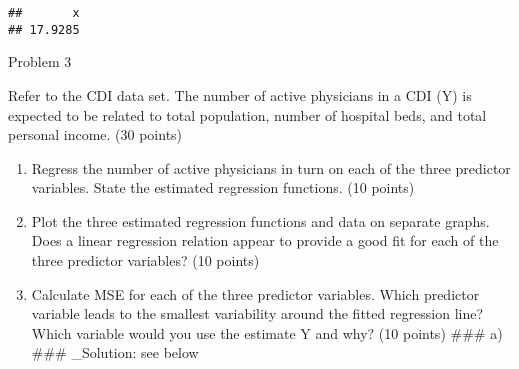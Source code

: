 \documentclass[
]{article}
\newenvironment{Shaded}{\begin{snugshade}}{\end{snugshade}}
\newcommand{\DecValTok}[1]{\textcolor[rgb]{0.00,0.00,0.81}{#1}}
\newcommand{\KeywordTok}[1]{\textcolor[rgb]{0.13,0.29,0.53}{\textbf{#1}}}
\newcommand{\NormalTok}[1]{#1}
\newcommand{\OperatorTok}[1]{\textcolor[rgb]{0.81,0.36,0.00}{\textbf{#1}}}
\newcommand{\StringTok}[1]{\textcolor[rgb]{0.31,0.60,0.02}{#1}}
\providecommand{\tightlist}{%
  \setlength{\itemsep}{0pt}\setlength{\parskip}{0pt}}
\begin{document}
\begin{Shaded}
\end{Shaded}

\begin{verbatim}
##       x 
## 17.9285
\end{verbatim}

Problem 3

Refer to the CDI data set. The number of active physicians in a CDI (Y)
is expected to be related to total population, number of hospital beds,
and total personal income. (30 points)

\begin{enumerate}
\def\labelenumi{\alph{enumi})}
\tightlist
\item
  Regress the number of active physicians in turn on each of the three
  predictor variables. State the estimated regression functions. (10
  points)
\item
  Plot the three estimated regression functions and data on separate
  graphs. Does a linear regression relation appear to provide a good fit
  for each of the three predictor variables? (10 points)
\item
  Calculate MSE for each of the three predictor variables. Which
  predictor variable leads to the smallest variability around the fitted
  regression line? Which variable would you use the estimate Y and why?
  (10 points) \#\#\# a) \#\#\# \_Solution: see below
\end{enumerate}

\begin{Shaded}
\end{Shaded}
\end{document}
